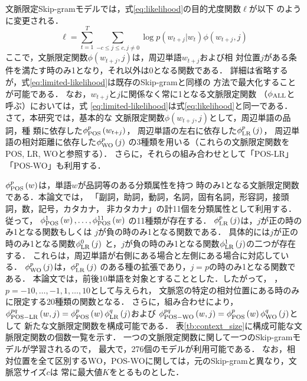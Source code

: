 \documentclass[japanese]{jnlp_1.4}
\begin{document}
文脈限定Skip-gramモデルでは，式\ref{eq:likelihood}の目的尤度関数$\ell$が以下
のように変更される．
\begin{equation}
  \ell=\sum_{t=1}^T \sum_{-c\leq j\leq c, j\neq 0} \log p(w_{t+j}|w_t) 
\phi(w_{t+j},j)
\label{eq:limited-likelihood}
\end{equation}
ここで，文脈限定関数$\phi(w_{t+j},j)$は，周辺単語$w_{t+j}$および相
対位置$j$がある条件を満たす時のみ1となり，それ以外は0となる関数である．
詳細は省略するが，式\ref{eq:limited-likelihood}は既存のSkip-gramと同様の
方法で最大化することが可能である．
なお，$w_{t+j}$と$j$に関係なく常に1となる文脈限定関数
（$\phi_{\rm{ALL}}$と呼ぶ）においては，式
\ref{eq:limited-likelihood}は式\ref{eq:likelihood}と同一である．
さて，本研究では，基本的な
文脈限定関数$\phi(w_{t+j},j)$として，周辺単語の品詞，種
類に依存した$\phi_{\rm{POS}}^{p}\left(w_{t+j}\right)$，
周辺単語の左右に依存した$\phi_{\rm{LR}}^{p}\left(j\right)$，
周辺単語の相対距離に依存した$\phi_{\rm{WO}}^{p}\left(j\right)$
の3種類を用いる（これらの文脈限定関数をPOS, LR, WOと参照する）．
さらに，それらの組み合わせとして「POS-LR」「POS-WO」も利用する．

$\phi_{\rm{POS}}^{p}\left(w\right)$は，単語$w$が品詞等のある分類属性を持つ
時のみ1となる文脈限定関数である．本論文では，
「副詞，助詞，動詞，名詞，固有名詞，形容詞，接頭詞，数，記号，カタカナ，
非カタカナ」の計11個を分類属性として利用する．従って，
$\phi_{\rm{POS}}^{1}\left(w\right),\ldots,\phi_{\rm{POS}}^{11}\left(w\right)$
の11種類が存在する．
$\phi_{\rm{LR}}^{p}\left(j\right)$は，$j$が正の時のみ1となる関数もしくは
$j$が負の時のみ1となる関数である．
具体的には$j$が正の時のみ1となる関数$\phi_{\rm{LR}}^{0}\left(j\right)$
と，$j$が負の時のみ1となる関数$\phi_{\rm{LR}}^{1}\left(j\right)$の二つが存在する．
これらは，周辺単語が右側にある場合と左側にある場合に対応している．
$\phi_{\rm{WO}}^{p}\left(j\right)$は，$\phi_{\rm{LR}}^{p}\left(j\right)$
のある種の拡張であり，$j=p$の時のみ1となる関数である．
本論文では，前後10単語を対象とすることとした．したがって，
，$p=-10,\ldots,-1,1,\ldots,10$として与えられ，
文脈窓の特定の相対位置にある時のみに限定する20種類の関数となる．
さらに，組み合わせにより，
$\phi_{\rm{POS-LR}}^{pq}\left(w,j\right)
=\phi_{\rm{POS}}^{p}\left(w\right)\phi_{\rm{LR}}^{q}\left(j\right)$および
$\phi_{\rm{POS-WO}}^{pq}\left(w,j\right)
=\phi_{\rm{POS}}^{p}\left(w\right)\phi_{\rm{WO}}^{q}\left(j\right)$として
新たな文脈限定関数を構成可能である．
表\ref{tb:context_size}に構成可能な文脈限定関数の個数一覧を示す．
一つの文脈限定関数に関して一つのSkip-gramモデルが学習されるので，
最大で，276個のモデルが利用可能である．
なお，相対位置を全て区別するWO，POS-WOに関しては，元のSkip-gramと異なり，文脈窓サイズ$c$は
常に最大値$K$をとるものとした．
\end{document}

